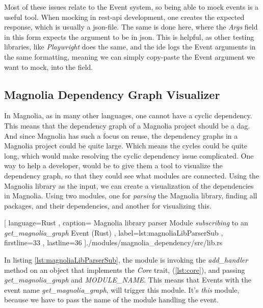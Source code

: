 Most of these issues relate to the Event system, so being able to mock events
is a useful tool. When mocking in \gls*{rest}-\gls*{api} development, one
creates the expected response, which is usually a \gls*{json}-file. The same is
done here, where the \textit{Args} field in this form expects the argument to be
in \gls*{json}. This is helpful, as other testing libraries, like
\textit{Playwright} does the same, and the \gls*{ide} logs the Event arguments
in the same formatting, meaning we can simply copy-paste the Event argument we
want to mock, into the field.

\subsection{Magnolia Dependency Graph Visualizer}

In Magnolia, as in many other languages, one cannot have a cyclic dependency.
This means that the dependency graph of a Magnolia project should be a
\gls*{dag}. And since Magnolia has such a focus on reuse, the dependency graphs
in a Magnolia project could be quite large. Which means the cycles could be
quite long, which would make resolving the cyclic dependency issue complicated.
One way to help a developer, would be to give them a tool to visualize the
dependency graph, so that they could see what modules are connected. Using the
Magnolia library as the input, we can create a visualization of the dependencies
in Magnolia. Using two modules, one for \textit{parsing} the Magnolia library,
finding all packages, and their dependencies, and another for visualizing
this.

\begin{center}
  
    [ language=Rust
    , caption={
      Magnolia library parser Module \textit{subscribing} to an
      \textit{get\_magnolia\_graph } Event (Rust)
    }
    , label=lst:magnoliaLibParserSub
    , firstline=33
    , lastline=36
    ]{./modules/magnolia\_dependency/src/lib.rs}
\end{center}

In listing \ref{lst:magnoliaLibParserSub}, the module is invoking the
\textit{add\_handler} method on an object that implements the \textit{Core} trait,
(\ref{lst:core}), and passing \textit{get\_magnolia\_graph} and
\textit{MODULE\_NAME}. This means that Events with the event name
\textit{get\_magnolia\_graph}, will trigger this module. It's \textit{this}
module, because we have to pass the name of the module handling the event.

